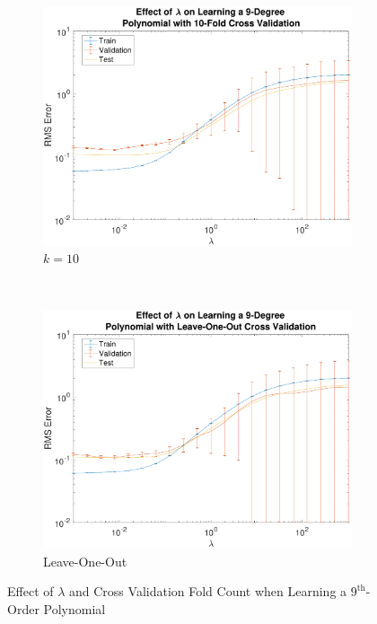 \documentclass{report}
\begin{document}
  \begin{figure}
    \centering
    \begin{subfigure}[t]{0.45\textwidth}
      \centering
      \includegraphics[width=1.0\textwidth]{img/lambda_sweep_k=10_degree=9.pdf}
      \caption{$k=10$}\label{fig:tenFoldCv}
    \end{subfigure}%
    ~ 
    \begin{subfigure}[t]{0.45\textwidth}
      \centering
      \includegraphics[width=1.0\textwidth]{img/lambda_sweep_leave_one_out_degree=9.pdf}
      \caption{Leave-One-Out}\label{fig:leaveOneOutCv}
    \end{subfigure}
    \caption{Effect of $\lambda$ and Cross Validation Fold Count when Learning a $9^{\text{th}}$-Order Polynomial}\label{fig:effectLambda}
  \end{figure}
\end{document}
